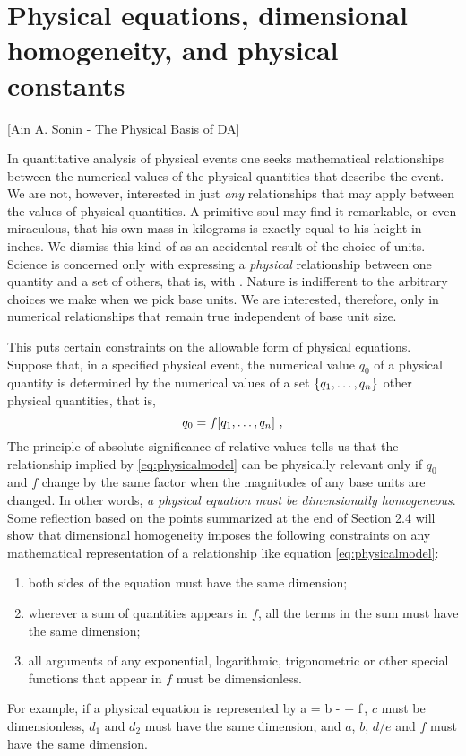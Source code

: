 \section{Physical equations, dimensional homogeneity, and physical constants}
%
[Ain A. Sonin - The Physical Basis of DA]

In quantitative analysis of physical events one seeks mathematical relationships between the numerical values of the physical quantities that describe the event. We are not, however, interested in just \emph{any} relationships that may apply between the values of physical quantities. A primitive soul may find it remarkable, or even miraculous, that his own mass in kilograms is exactly equal to his height in inches. We dismiss this kind of  as an accidental result of the choice of units. Science is concerned only with expressing a \emph{physical} relationship between one quantity and a set of others, that is, with . Nature is indifferent to the arbitrary choices we make when we pick base units. We are interested, therefore, only in numerical relationships that remain true independent of base unit size.

This puts certain constraints on the allowable form of physical equations. Suppose that, in a specified physical event, the numerical value $q_0$ of a physical quantity is determined by the numerical values of a set $\left\lbrace{q_1, \dotsc, q_n}\right\rbrace$ other physical quantities, that is,
%
\begin{equation}\label{eq:physicalmodel}
q_0 = f\!\left[{q_1, \dotsc, q_n}\right]\,,
\end{equation}
%
The principle of absolute significance of relative values tells us that the relationship implied by \cref{eq:physicalmodel} can be physically relevant only if $q_0$ and $f$ change by the same factor when the magnitudes of any base units are changed. In other words, \emph{a physical equation must be dimensionally homogeneous}. Some reflection based on the points summarized at the end of Section 2.4 will show that dimensional homogeneity imposes the following constraints on any mathematical representation of a relationship like equation \cref{eq:physicalmodel}:
%
\begin{enumerate}
\item  both sides of the equation must have the same dimension;
%
\item wherever a sum of quantities appears in $f$, all the terms in the sum must have the same dimension;
%
\item all arguments of any exponential, logarithmic, trigonometric or other special functions that appear in $f$ must be dimensionless.
\end{enumerate}
%
For example, if a physical equation is represented by
%
\beq
a = b\exp{} -  + f\,,
\eeq
%
$c$ must be dimensionless, $d_1$ and $d_2$ must have the same dimension, and $a$, $b$, $d/e$ and $f$ must have the same dimension.

